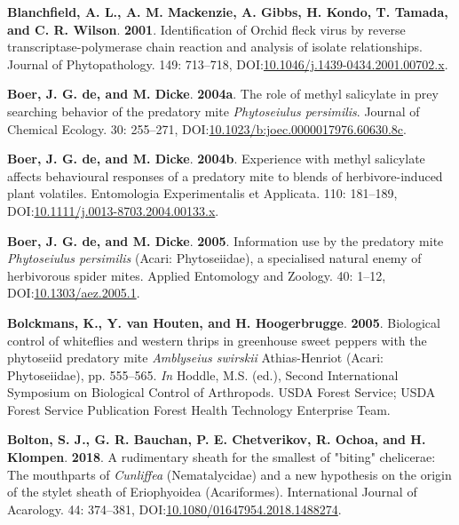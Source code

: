 \documentclass[12pt,final,CPage]{ufthesis}
\newlength{\cslhangindent}
\newenvironment{CSLReferences}[2] %
{%
	\setlength{\parindent}{0pt}
	\ifodd #1 \everypar{\setlength{\hangindent}{\cslhangindent}}\ignorespaces\fi
	\ifnum #2 > 0
	\setlength{\parskip}{#2\baselineskip}
	\fi
}%
{}
\begin{document}
{\begin{CSLReferences}{1}{0}
  \leavevmode{}%
  \textbf{Blanchfield, A. L., A. M. Mackenzie, A. Gibbs, H. Kondo, T. Tamada, and C. R. Wilson}. \textbf{2001}. Identification of {Orchid fleck virus} by reverse transcriptase-polymerase chain reaction and analysis of isolate relationships. Journal of Phytopathology. 149: 713--718, DOI:\href{https://doi.org/10.1046/j.1439-0434.2001.00702.x}{10.1046/j.1439-0434.2001.00702.x}.

  \leavevmode{}%
  \textbf{Boer, J. G. de, and M. Dicke}. \textbf{2004a}. The role of methyl salicylate in prey searching behavior of the predatory mite {\emph{Phytoseiulus persimilis}}. Journal of Chemical Ecology. 30: 255--271, DOI:\href{https://doi.org/10.1023/b:joec.0000017976.60630.8c}{10.1023/b:joec.0000017976.60630.8c}.

  \leavevmode{}%
  \textbf{Boer, J. G. de, and M. Dicke}. \textbf{2004b}. Experience with methyl salicylate affects behavioural responses of a predatory mite to blends of herbivore-induced plant volatiles. Entomologia Experimentalis et Applicata. 110: 181--189, DOI:\href{https://doi.org/10.1111/j.0013-8703.2004.00133.x}{10.1111/j.0013-8703.2004.00133.x}.

  \leavevmode{}%
  \textbf{Boer, J. G. de, and M. Dicke}. \textbf{2005}. Information use by the predatory mite {\emph{Phytoseiulus persimilis}} {({Acari}: {Phytoseiidae})}, a specialised natural enemy of herbivorous spider mites. Applied Entomology and Zoology. 40: 1--12, DOI:\href{https://doi.org/10.1303/aez.2005.1}{10.1303/aez.2005.1}.

  \leavevmode{}%
  \textbf{Bolckmans, K., Y. van Houten, and H. Hoogerbrugge}. \textbf{2005}. Biological control of whiteflies and western thrips in greenhouse sweet peppers with the phytoseiid predatory mite {\emph{Amblyseius swirskii}} {Athias-Henriot} ({Acari}: {Phytoseiidae}), pp. 555--565. \emph{In} Hoddle, M.S. (ed.), Second International Symposium on Biological Control of Arthropods. USDA Forest Service; USDA Forest Service Publication Forest Health Technology Enterprise Team.

  \leavevmode{}%
  \textbf{Bolton, S. J., G. R. Bauchan, P. E. Chetverikov, R. Ochoa, and H. Klompen}. \textbf{2018}. A rudimentary sheath for the smallest of "biting" chelicerae: The mouthparts of {\emph{Cunliffea}} ({Nematalycidae}) and a new hypothesis on the origin of the stylet sheath of {Eriophyoidea} ({Acariformes}). International Journal of Acarology. 44: 374--381, DOI:\href{https://doi.org/10.1080/01647954.2018.1488274}{10.1080/01647954.2018.1488274}.


\end{CSLReferences}}
\end{document}

